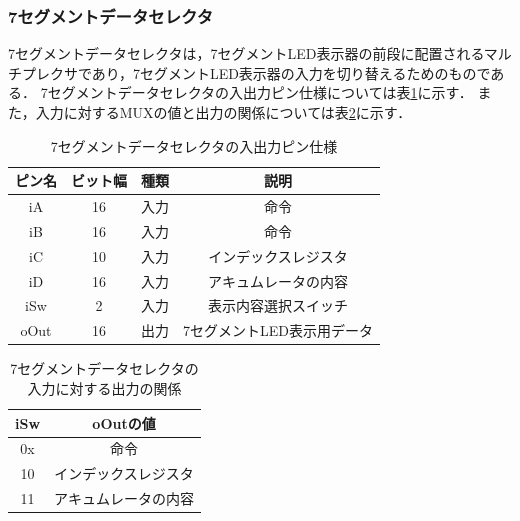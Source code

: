 \documentclass[a4paper,11pt]{ltjsarticle}
\begin{document}
\subsubsection{7セグメントデータセレクタ}
7セグメントデータセレクタは，7セグメントLED表示器の前段に配置されるマルチプレクサであり，7セグメントLED表示器の入力を切り替えるためのものである．
7セグメントデータセレクタの入出力ピン仕様については表\ref{tab:7seg_sel}に示す．
また，入力に対するMUXの値と出力の関係については表\ref{tab:7seg_sel_value}に示す．
\begin{table}[H]
    \centering
    \caption{7セグメントデータセレクタの入出力ピン仕様}
    \label{tab:7seg_sel}
    \begin{tabular}{|c|c|c|c|}
        \hline
        ピン名  & ビット幅 & 種類 & 説明              \\
        \hline
        iA   & 16   & 入力 & 命令              \\
        \hline
        iB   & 16   & 入力 & 命令              \\
        \hline
        iC   & 10   & 入力 & インデックスレジスタ      \\
        \hline
        iD   & 16   & 入力 & アキュムレータの内容      \\
        \hline
        iSw  & 2    & 入力 & 表示内容選択スイッチ      \\
        \hline
        oOut & 16   & 出力 & 7セグメントLED表示用データ \\
        \hline
    \end{tabular}
\end{table}
\begin{table}[H]
    \centering
    \caption{7セグメントデータセレクタの入力に対する出力の関係}
    \label{tab:7seg_sel_value}
    \begin{tabular}{|c|c|}
        \hline
        iSw & oOutの値     \\
        \hline
        0x  & 命令         \\
        \hline
        10  & インデックスレジスタ \\
        \hline
        11  & アキュムレータの内容 \\
        \hline
    \end{tabular}
\end{table}
\end{document}
